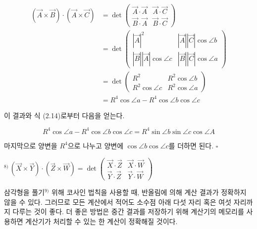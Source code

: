 \documentclass{article}
\begin{document}
\begin{align*}
  (\vec{A}\times\vec{B})\cdot(\vec{A}\times\vec{C})
  &= \det\begin{pmatrix}\vec{A}\cdot\vec{A} & \vec{A}\cdot\vec{C}\\[4pt]
                         \vec{B}\cdot\vec{A} & \vec{B}\cdot\vec{C}\end{pmatrix} \\[6pt]
  &= \det\begin{pmatrix}|\vec{A}|^2 & |\vec{A}||\vec{C}|\cos\angle b\\[4pt]
                         |\vec{B}||\vec{A}|\cos\angle c & |\vec{B}||\vec{C}|\cos\angle a\end{pmatrix} \\[6pt]
  &= \det\begin{pmatrix}R^2 & R^2\cos\angle b\\[4pt]
                         R^2\cos\angle c & R^2\cos\angle a\end{pmatrix} \\[6pt]
  &= R^4\cos\angle a - R^4\cos\angle b\cos\angle c
\end{align*}

이 결과와 식 (2.14)로부터 다음을 얻는다.

\[
  R^4\cos\angle a - R^4\cos\angle b\cos\angle c = R^4\sin\angle b\sin\angle c\cos\angle A
\]

마지막으로 양변을 $R^4$으로 나누고 양변에 $\cos\angle b\cos\angle c$를 더하면 된다. \hfill $\square$

\medskip
\noindent$^{8)}$\,\small$(\vec{X}\times\vec{Y})\cdot(\vec{Z}\times\vec{W})
  = \det\!\begin{pmatrix}\vec{X}\cdot\vec{Z} & \vec{X}\cdot\vec{W}\\
  \vec{Y}\cdot\vec{Z} & \vec{Y}\cdot\vec{W}\end{pmatrix}$\normalsize

\bigskip

\begin{tcolorbox}[
  colback=teal!4, colframe=teal!65!black,
  title=참고,
  fonttitle=\bfseries, boxrule=0.5mm, arc=3mm]

삼각형을 풀기$^{9)}$ 위해 코사인 법칙을 사용할 때, 반올림에 의해 계산 결과가 정확하지 않을 수 있다.
그러므로 모든 계산에서 적어도 소수점 아래 다섯 자리 혹은 여섯 자리까지 다루는 것이 좋다.
더 좋은 방법은 중간 결과를 저장하기 위해 계산기의 메모리를 사용하면 계산기가 처리할 수 있는 한 계산이 정확해질 것이다.

\end{tcolorbox}
\end{document}
